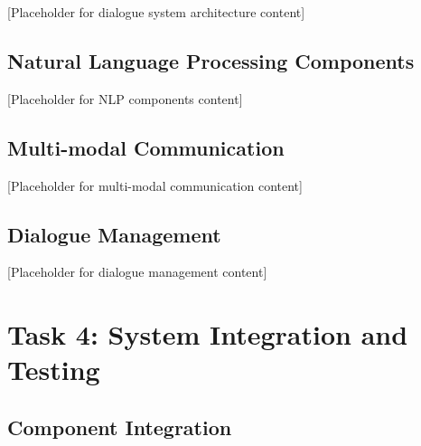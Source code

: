 \documentclass[12pt,a4paper]{article}
\begin{document}

[Placeholder for dialogue system architecture content]

\subsection{Natural Language Processing Components}


[Placeholder for NLP components content]

\subsection{Multi-modal Communication}


[Placeholder for multi-modal communication content]

\subsection{Dialogue Management}


[Placeholder for dialogue management content]

\section{Task 4: System Integration and Testing}


\subsection{Component Integration}

\end{document}
